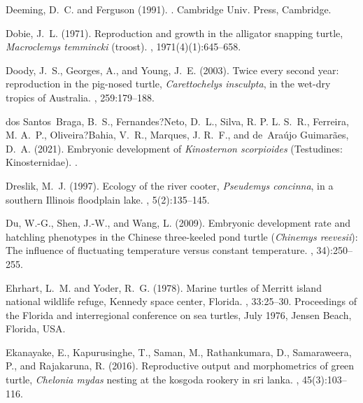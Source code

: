 \documentclass{article}
\begin{document}
\begin{thebibliography}{}
Deeming, D.~C. and Ferguson (1991).
.
\newblock Cambridge Univ. Press, Cambridge.

Dobie, J.~L. (1971).
\newblock Reproduction and growth in the alligator snapping turtle,
  \emph{Macroclemys temmincki} (troost).
, 1971(4)(1):645--658.

Doody, J.~S., Georges, A., and Young, J.~E. (2003).
\newblock Twice every second year: reproduction in the pig-nosed turtle,
  \emph{Carettochelys insculpta}, in the wet-dry tropics of {A}ustralia.
, 259:179--188.

dos Santos~Braga, B.~S., Fernandes?Neto, D.~L., Silva, R. P. L. S.~R.,
  Ferreira, M. A.~P., Oliveira?Bahia, V.~R., Marques, J. R.~F., and
  de~Ara\'{u}jo Guimar\~{a}es, D.~A. (2021).
\newblock Embryonic development of \emph{Kinosternon scorpioides}
  ({T}estudines: {K}inosternidae).
.

Dreslik, M.~J. (1997).
\newblock Ecology of the river cooter, \emph{Pseudemys concinna}, in a southern
  {I}llinois floodplain lake.
, 5(2):135--145.

Du, W.-G., Shen, J.-W., and Wang, L. (2009).
\newblock Embryonic development rate and hatchling phenotypes in the {C}hinese
  three-keeled pond turtle (\emph{Chinemys reevesii}): The influence of
  fluctuating temperature versus constant temperature.
, 34):250--255.

Ehrhart, L.~M. and Yoder, R.~G. (1978).
\newblock Marine turtles of {M}erritt island national wildlife refuge,
  {K}ennedy space center, {F}lorida.
, 33:25--30.
\newblock Proceedings of the Florida and interregional conference on sea
  turtles, July 1976, Jensen Beach, Florida, USA.

Ekanayake, E., Kapurusinghe, T., Saman, M., Rathankumara, D., Samaraweera, P.,
  and Rajakaruna, R. (2016).
\newblock Reproductive output and morphometrics of green turtle, \emph{Chelonia
  mydas} nesting at the kosgoda rookery in sri lanka.
, 45(3):103--116.


\end{thebibliography}
\end{document}
